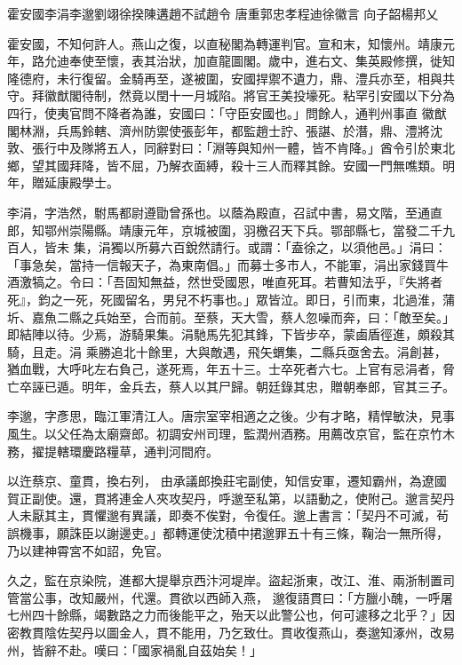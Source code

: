 
\begin{pinyinscope}
霍安國李涓李邈劉翊徐揆陳遘趙不試趙令
 唐重郭忠孝程迪徐徽言
 向子韶楊邦乂



 霍安國，不知何許人。燕山之復，以直秘閣為轉運判官。宣和末，知懷州。靖康元年，路允迪奉使至懷，表其治狀，加直龍圖閣。歲中，進右文、集英殿修撰，徙知隆德府，未行復留。金騎再至，遂被圍，安國捍禦不遺力，鼎、澧兵亦至，相與共守。拜徽猷閣待制，然竟以閏十一月城陷。將官王美投壕死。粘罕引安國以下分為四行，使夷官問不降者為誰，安國曰：「守臣安國也。」問餘人，通判州事直
 徽猷閣林淵，兵馬鈴轄、濟州防禦使張彭年，都監趙士詝、張諶、於潛，鼎、澧將沈敦、張行中及隊將五人，同辭對曰：「淵等與知州一體，皆不肯降。」酋令引於東北鄉，望其國拜降，皆不屈，乃解衣面縛，殺十三人而釋其餘。安國一門無噍類。明年，贈延康殿學士。



 李涓，字浩然，駙馬都尉遵勖曾孫也。以蔭為殿直，召試中書，易文階，至通直郎，知鄂州崇陽縣。靖康元年，京城被圍，羽檄召天下兵。鄂部縣七，當發二千九百人，皆未
 集，涓獨以所募六百銳然請行。或謂：「盍徐之，以須他邑。」涓曰：「事急矣，當持一信報天子，為東南倡。」而募士多市人，不能軍，涓出家錢買牛酒激犒之。令曰：「吾固知無益，然世受國恩，唯直死耳。若曹知法乎，『失將者死』，鈞之一死，死國留名，男兒不朽事也。」眾皆泣。即日，引而東，北過淮，蒲圻、嘉魚二縣之兵始至，合而前。至蔡，天大雪，蔡人忽噪而奔，曰：「敵至矣。」即結陣以待。少焉，游騎果集。涓馳馬先犯其鋒，下皆步卒，蒙鹵盾徑進，頗殺其騎，且走。涓
 乘勝追北十餘里，大與敵遇，飛矢蝟集，二縣兵亟舍去。涓創甚，猶血戰，大呼叱左右負己，遂死焉，年五十三。士卒死者六七。上官有忌涓者，脅亡卒誣已遁。明年，金兵去，蔡人以其尸歸。朝廷錄其忠，贈朝奉郎，官其三子。



 李邈，字彥思，臨江軍清江人。唐宗室宰相適之之後。少有才略，精悍敏決，見事風生。以父任為太廟齋郎。初調安州司理，監潤州酒務。用薦改京官，監在京竹木務，擢提轄環慶路糧草，通判河間府。



 以迕蔡京、童貫，換右列，
 由承議郎換莊宅副使，知信安軍，遷知霸州，為遼國賀正副使。還，貫將連金人夾攻契丹，呼邈至私第，以語動之，使附己。邈言契丹人未厭其主，貫懼邈有異議，即奏不俟對，令復任。邈上書言：「契丹不可滅，茍誤機事，願誅臣以謝邊吏。」都轉運使沈積中捃邈罪五十有三條，鞠治一無所得，乃以建神霄宮不如詔，免官。



 久之，監在京染院，進都大提舉京西汴河堤岸。盜起浙東，改江、淮、兩浙制置司管當公事，改知嚴州，代還。貫欲以西師入燕，
 邈復語貫曰：「方臘小醜，一呼屠七州四十餘縣，竭數路之力而後能平之，殆天以此警公也，何可遽移之北乎？」因密教貫陰佐契丹以圖金人，貫不能用，乃乞致仕。貫收復燕山，奏邈知涿州，改易州，皆辭不赴。嘆曰：「國家禍亂自茲始矣！」




\end{pinyinscope}
